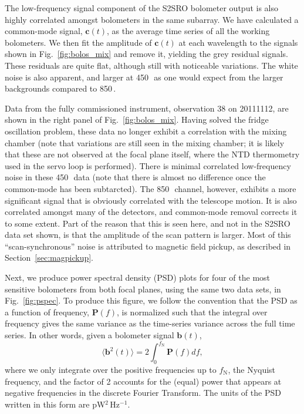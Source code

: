 \documentclass[useAMS,usenatbib,nofootinbib]{mn2e}
\begin{document}
The low-frequency signal component of the S2SRO bolometer output is
also highly correlated amongst bolometers in the same subarray. We
have calculated a common-mode signal, $\mathbf{c}(t)$, as the average
time series of all the working bolometers. We then fit the amplitude
of $\mathbf{c}(t)$ at each wavelength to the signals shown in
Fig.~\ref{fig:bolos_mix} and remove it, yielding the grey residual
signals. These residuals are quite flat, although still with
noticeable variations. The white noise is also apparent, and larger at
450\,\micron\ as one would expect from the larger backgrounds compared
to 850\,\micron.

Data from the fully commissioned instrument, observation 38 on
20111112, are shown in the right panel of
Fig.~\ref{fig:bolos_mix}. Having solved the fridge oscillation
problem, these data no longer exhibit a correlation with the mixing
chamber (note that variations are still seen in the mixing chamber; it
is likely that these are not observed at the focal plane itself, where
the NTD thermometry used in the servo loop is performed). There is
minimal correlated low-frequency noise in these 450\,\micron\ data
(note that there is almost no difference once the common-mode has been
subtarcted). The 850\,\micron\ channel, however, exhibits a more
significant signal that is obviously correlated with the telescope
motion. It is also correlated amongst many of the detectors, and
common-mode removal corrects it to some extent. Part of the reason
that this is seen here, and not in the S2SRO data set shown, is that
the amplitude of the scan pattern is larger. Most of this
``scan-synchronous'' noise is attributed to magnetic field pickup, as
described in Section~\ref{sec:magpickup}.

Next, we produce power spectral density (PSD) plots for four of the
most sensitive bolometers from both focal planes, using the same two
data sets, in Fig.~\ref{fig:pspec}. To produce this figure, we follow
the convention that the PSD as a function of frequency,
$\mathbf{P}(f)$, is normalized such that the integral over frequency
gives the same variance as the time-series variance across the full
time series. In other words, given a bolometer signal $\mathbf{b}(t)$,
%
\begin{equation}
\label{eq:psd}
\langle\mathbf{b}^2(t)\rangle = 2 \int_0^{f_\mathrm{N}} \mathbf{P}(f)
df ,
\end{equation}
%
where we only integrate over the positive frequencies up to
$f_\mathrm{N}$, the Nyquist frequency, and the factor of 2 accounts
for the (equal) power that appears at negative frequencies in the
discrete Fourier Transform. The units of the PSD written in this form
are pW$^2$\,Hz$^{-1}$.
\end{document}
